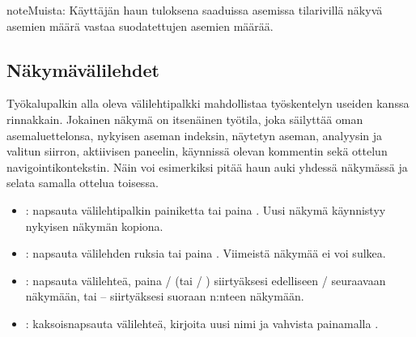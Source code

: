\documentclass[letterpaper,10pt,finnish]{sphinxmanual}
\begin{document}
\begin{sphinxadmonition}{note}{Muista:}
\sphinxAtStartPar
Käyttäjän haun tuloksena saaduissa asemissa tilarivillä näkyvä asemien määrä vastaa suodatettujen asemien määrää.
\end{sphinxadmonition}


\subsection{Näkymävälilehdet}
\label{\detokenize{manuel:onglets-de-vues}}\label{\detokenize{manuel:onglets-vues}}
\sphinxAtStartPar
Työkalupalkin alla oleva välilehtipalkki mahdollistaa työskentelyn useiden  kanssa rinnakkain. Jokainen näkymä on itsenäinen työtila, joka säilyttää oman asemaluettelonsa, nykyisen aseman indeksin, näytetyn aseman, analyysin ja valitun siirron, aktiivisen paneelin, käynnissä olevan kommentin sekä ottelun navigointikontekstin. Näin voi esimerkiksi pitää haun auki yhdessä näkymässä ja selata samalla ottelua toisessa.
\begin{itemize}
\item {} 
\sphinxAtStartPar
{}: napsauta välilehtipalkin \sphinxstyleemphasis{+}\sphinxhyphen{}painiketta tai paina . Uusi näkymä käynnistyy nykyisen näkymän kopiona.

\item {} 
\sphinxAtStartPar
{}: napsauta välilehden ruksia tai paina . Viimeistä näkymää ei voi sulkea.

\item {} 
\sphinxAtStartPar
{}: napsauta välilehteä, paina  /  (tai  / ) siirtyäksesi edelliseen / seuraavaan näkymään, tai  –  siirtyäksesi suoraan n:nteen näkymään.

\item {} 
\sphinxAtStartPar
{}: kaksoisnapsauta välilehteä, kirjoita uusi nimi ja vahvista painamalla .

\end{itemize}
\end{document}
